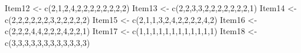 \documentclass[
  english,
]{book}
\newenvironment{Shaded}{\begin{snugshade}}{\end{snugshade}}
\newcommand{\DecValTok}[1]{\textcolor[rgb]{0.00,0.00,0.81}{#1}}
\newcommand{\FunctionTok}[1]{\textcolor[rgb]{0.00,0.00,0.00}{#1}}
\newcommand{\NormalTok}[1]{#1}
\newcommand{\OtherTok}[1]{\textcolor[rgb]{0.56,0.35,0.01}{#1}}
\begin{document}
\begin{Shaded}
\begin{Highlighting}[]
\NormalTok{Item12 }\OtherTok{\textless{}{-}} \FunctionTok{c}\NormalTok{(}\DecValTok{2}\NormalTok{,}\DecValTok{1}\NormalTok{,}\DecValTok{2}\NormalTok{,}\DecValTok{4}\NormalTok{,}\DecValTok{2}\NormalTok{,}\DecValTok{2}\NormalTok{,}\DecValTok{2}\NormalTok{,}\DecValTok{2}\NormalTok{,}\DecValTok{2}\NormalTok{,}\DecValTok{2}\NormalTok{,}\DecValTok{2}\NormalTok{,}\DecValTok{2}\NormalTok{)}
\NormalTok{Item13 }\OtherTok{\textless{}{-}} \FunctionTok{c}\NormalTok{(}\DecValTok{2}\NormalTok{,}\DecValTok{2}\NormalTok{,}\DecValTok{3}\NormalTok{,}\DecValTok{3}\NormalTok{,}\DecValTok{2}\NormalTok{,}\DecValTok{2}\NormalTok{,}\DecValTok{2}\NormalTok{,}\DecValTok{2}\NormalTok{,}\DecValTok{2}\NormalTok{,}\DecValTok{2}\NormalTok{,}\DecValTok{2}\NormalTok{,}\DecValTok{1}\NormalTok{)}
\NormalTok{Item14 }\OtherTok{\textless{}{-}} \FunctionTok{c}\NormalTok{(}\DecValTok{2}\NormalTok{,}\DecValTok{2}\NormalTok{,}\DecValTok{2}\NormalTok{,}\DecValTok{2}\NormalTok{,}\DecValTok{2}\NormalTok{,}\DecValTok{2}\NormalTok{,}\DecValTok{3}\NormalTok{,}\DecValTok{2}\NormalTok{,}\DecValTok{2}\NormalTok{,}\DecValTok{2}\NormalTok{,}\DecValTok{2}\NormalTok{,}\DecValTok{2}\NormalTok{)}
\NormalTok{Item15 }\OtherTok{\textless{}{-}} \FunctionTok{c}\NormalTok{(}\DecValTok{2}\NormalTok{,}\DecValTok{1}\NormalTok{,}\DecValTok{1}\NormalTok{,}\DecValTok{3}\NormalTok{,}\DecValTok{2}\NormalTok{,}\DecValTok{4}\NormalTok{,}\DecValTok{2}\NormalTok{,}\DecValTok{2}\NormalTok{,}\DecValTok{2}\NormalTok{,}\DecValTok{2}\NormalTok{,}\DecValTok{4}\NormalTok{,}\DecValTok{2}\NormalTok{)}
\NormalTok{Item16 }\OtherTok{\textless{}{-}} \FunctionTok{c}\NormalTok{(}\DecValTok{2}\NormalTok{,}\DecValTok{2}\NormalTok{,}\DecValTok{2}\NormalTok{,}\DecValTok{4}\NormalTok{,}\DecValTok{4}\NormalTok{,}\DecValTok{2}\NormalTok{,}\DecValTok{2}\NormalTok{,}\DecValTok{2}\NormalTok{,}\DecValTok{4}\NormalTok{,}\DecValTok{2}\NormalTok{,}\DecValTok{2}\NormalTok{,}\DecValTok{1}\NormalTok{)}
\NormalTok{Item17 }\OtherTok{\textless{}{-}} \FunctionTok{c}\NormalTok{(}\DecValTok{1}\NormalTok{,}\DecValTok{1}\NormalTok{,}\DecValTok{1}\NormalTok{,}\DecValTok{1}\NormalTok{,}\DecValTok{1}\NormalTok{,}\DecValTok{1}\NormalTok{,}\DecValTok{1}\NormalTok{,}\DecValTok{1}\NormalTok{,}\DecValTok{1}\NormalTok{,}\DecValTok{1}\NormalTok{,}\DecValTok{1}\NormalTok{,}\DecValTok{1}\NormalTok{)}
\NormalTok{Item18 }\OtherTok{\textless{}{-}} \FunctionTok{c}\NormalTok{(}\DecValTok{3}\NormalTok{,}\DecValTok{3}\NormalTok{,}\DecValTok{3}\NormalTok{,}\DecValTok{3}\NormalTok{,}\DecValTok{3}\NormalTok{,}\DecValTok{3}\NormalTok{,}\DecValTok{3}\NormalTok{,}\DecValTok{3}\NormalTok{,}\DecValTok{3}\NormalTok{,}\DecValTok{3}\NormalTok{,}\DecValTok{3}\NormalTok{,}\DecValTok{3}\NormalTok{)}

\end{Highlighting}
\end{Shaded}
\end{document}
